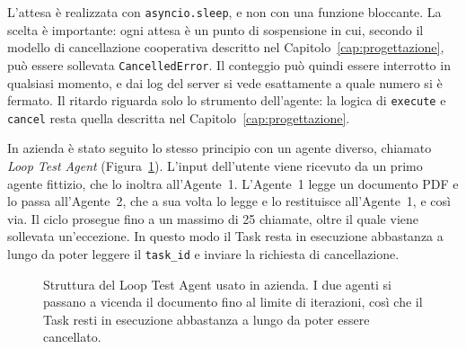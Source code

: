 L'attesa è realizzata con \texttt{asyncio.sleep}, e non con una funzione bloccante. La scelta è importante: ogni attesa è un punto di sospensione in cui, secondo il modello di cancellazione cooperativa descritto nel Capitolo~\ref{cap:progettazione}, può essere sollevata \texttt{CancelledError}. Il conteggio può quindi essere interrotto in qualsiasi momento, e dai log del server si vede esattamente a quale numero si è fermato. Il ritardo riguarda solo lo strumento dell'agente: la logica di \texttt{execute} e \texttt{cancel} resta quella descritta nel Capitolo~\ref{cap:progettazione}.

In azienda è stato seguito lo stesso principio con un agente diverso, chiamato \emph{Loop Test Agent} (Figura~\ref{fig:loop-agent}). L'input dell'utente viene ricevuto da un primo agente fittizio, che lo inoltra all'Agente~1. L'Agente~1 legge un documento PDF e lo passa all'Agente~2, che a sua volta lo legge e lo restituisce all'Agente~1, e così via. Il ciclo prosegue fino a un massimo di 25 chiamate, oltre il quale viene sollevata un'eccezione. In questo modo il Task resta in esecuzione abbastanza a lungo da poter leggere il \texttt{task\_id} e inviare la richiesta di cancellazione.

\begin{figure}[htbp]
    \centering
    \caption{Struttura del Loop Test Agent usato in azienda. I due agenti si passano a vicenda il documento fino al limite di iterazioni, così che il Task resti in esecuzione abbastanza a lungo da poter essere cancellato.}
    \label{fig:loop-agent}
\end{figure}

